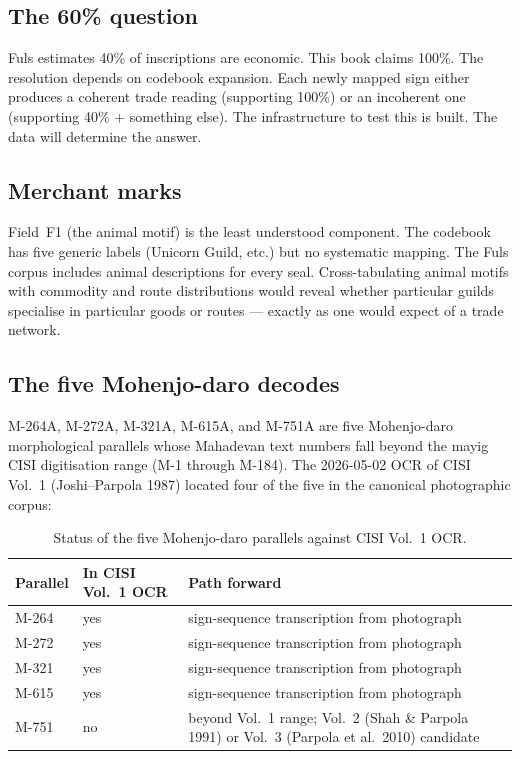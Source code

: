 \subsection{The 60\% question}

Fuls estimates 40\% of inscriptions are economic. This book
claims 100\%. The resolution depends on codebook expansion. Each
newly mapped sign either produces a coherent trade reading
(supporting 100\%) or an incoherent one (supporting 40\% + something
else). The infrastructure to test this is built. The data will
determine the answer.

\subsection{Merchant marks}

Field~F1 (the animal motif) is the least understood component.
The codebook has five generic labels (Unicorn Guild, etc.) but no
systematic mapping. The Fuls corpus includes animal descriptions
for every seal. Cross-tabulating animal motifs with commodity and
route distributions would reveal whether particular guilds
specialise in particular goods or routes --- exactly as one would
expect of a trade network.

\subsection{The five Mohenjo-daro decodes}

M-264A, M-272A, M-321A, M-615A, and M-751A are five Mohenjo-daro
morphological parallels whose Mahadevan text numbers fall beyond
the mayig CISI digitisation range (M-1 through M-184). The
2026-05-02 OCR of CISI Vol.~1 (Joshi--Parpola
1987)\smartcite{JoshiParpola1987} located four of the five in the
canonical photographic corpus:

\begin{longtable}{@{}lll@{}}
\caption{Status of the five Mohenjo-daro parallels against
CISI Vol.~1 OCR.}
\label{tab:five-md}\\
\toprule
Parallel & In CISI Vol.~1 OCR & Path forward \\
\midrule
\endfirsthead
\bottomrule
\endlastfoot
M-264 & yes & sign-sequence transcription from photograph \\
\midrule
M-272 & yes & sign-sequence transcription from photograph \\
\midrule
M-321 & yes & sign-sequence transcription from photograph \\
\midrule
M-615 & yes & sign-sequence transcription from photograph \\
\midrule
M-751 & no  & beyond Vol.~1 range; Vol.~2 (Shah \& Parpola 1991)
              or Vol.~3 (Parpola et al.\ 2010) candidate \\
\end{longtable}

